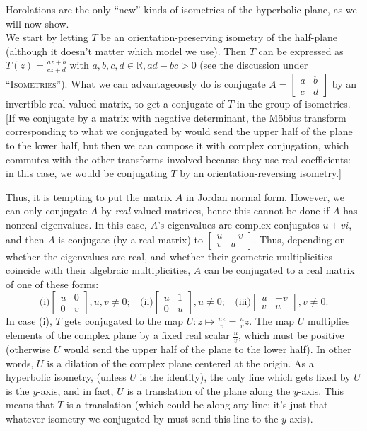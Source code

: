 \documentclass[leqno]{book}
\begin{document}
Horolations are the only ``new'' kinds of isometries of the hyperbolic plane, as we will now show.\\

\noindent We start by letting $T$ be an orientation-preserving isometry of the half-plane (although it doesn't matter which model we use).  Then $T$ can be expressed as $T(z)=\frac{az+b}{cz+d}$ with $a,b,c,d\in\mathbb R,ad-bc>0$ (see the discussion under ``\textsc{Isometries}'').  What we can advantageously do is conjugate $A=\begin{bmatrix}a&b\\c&d\end{bmatrix}$ by an invertible real-valued matrix, to get a conjugate of $T$ in the group of isometries.  [If we conjugate by a matrix with negative determinant, the M\"obius transform corresponding to what we conjugated by would send the upper half of the plane to the lower half, but then we can compose it with complex conjugation, which commutes with the other transforms involved because they use real coefficients: in this case, we would be conjugating $T$ by an orientation-reversing isometry.] %

Thus, it is tempting to put the matrix $A$ in Jordan normal form.  However, we can only conjugate $A$ by \emph{real}-valued matrices, hence this cannot be done if $A$ has nonreal eigenvalues.  In this case, $A$'s eigenvalues are complex conjugates $u\pm vi$, and then $A$ is conjugate (by a real matrix) to $\begin{bmatrix}u&-v\\v&u\end{bmatrix}$.  Thus, depending on whether the eigenvalues are real, and whether their geometric multiplicities coincide with their algebraic multiplicities, $A$ can be conjugated to a real matrix of one of these forms:
$$\text{(i)} \begin{bmatrix}u&0\\0&v\end{bmatrix},u,v\ne 0;~~~~\text{(ii)} \begin{bmatrix}u&1\\0&u\end{bmatrix},u\ne 0;~~~~\text{(iii)} \begin{bmatrix}u&-v\\v&u\end{bmatrix},v\ne 0.$$
In case (i), $T$ gets conjugated to the map $U:z\mapsto\frac{uz}v=\frac uvz$.  The map $U$ multiplies elements of the complex plane by a fixed real scalar $\frac uv$, which must be positive (otherwise $U$ would send the upper half of the plane to the lower half).  In other words, $U$ is a dilation of the complex plane centered at the origin.  As a hyperbolic isometry, (unless $U$ is the identity), the only line which gets fixed by $U$ is the $y$-axis, and in fact, $U$ is a translation of the plane along the $y$-axis.  This means that $T$ is a translation (which could be along any line; it's just that whatever isometry we conjugated by must send this line to the $y$-axis).
\end{document}
